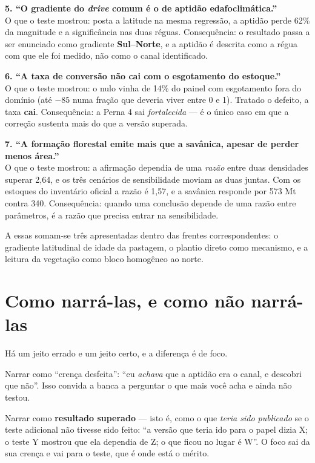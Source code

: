 \textbf{5. ``O gradiente do \emph{drive} comum é o de aptidão
edafoclimática.''}  \\
O que o teste mostrou: posta a latitude na mesma regressão, a aptidão perde 62\%
da magnitude e a significância nas duas réguas. Consequência: o resultado passa
a ser enunciado como gradiente \textbf{Sul--Norte}, e a aptidão é descrita como
a régua com que ele foi medido, não como o canal identificado.

\textbf{6. ``A taxa de conversão não cai com o esgotamento do estoque.''}
 \\
O que o teste mostrou: o nulo vinha de 14\% do painel com esgotamento fora do
domínio (até $-85$ numa fração que deveria viver entre 0 e 1). Tratado o
defeito, a taxa \textbf{cai}. Consequência: a Perna 4 sai \emph{fortalecida} ---
é o único caso em que a correção sustenta mais do que a versão superada.

\textbf{7. ``A formação florestal emite mais que a savânica, apesar de perder
menos área.''}  \\
O que o teste mostrou: a afirmação dependia de uma \emph{razão} entre duas
densidades superar 2,64, e os três cenários de sensibilidade moviam as duas
juntas. Com os estoques do inventário oficial a razão é 1,57, e a savânica
responde por 573 Mt contra 340. Consequência: quando uma conclusão depende de
uma razão entre parâmetros, é a razão que precisa entrar na sensibilidade.

\vspace{8pt}
A essas somam-se três apresentadas dentro das frentes correspondentes: o
gradiente latitudinal de idade da pastagem, o plantio direto como mecanismo, e a
leitura da vegetação como bloco homogêneo ao norte.

\section{Como narrá-las, e como não narrá-las}

Há um jeito errado e um jeito certo, e a diferença é de foco.

\begin{armadilha}
Narrar como ``crença desfeita'': ``eu \emph{achava} que a aptidão era o canal, e
descobri que não''. Isso convida a banca a perguntar o que mais você acha e
ainda não testou.
\end{armadilha}

\begin{nabanca}
Narrar como \textbf{resultado superado} --- isto é, como o que \emph{teria sido
publicado} se o teste adicional não tivesse sido feito: ``a versão que teria ido
para o papel dizia X; o teste Y mostrou que ela dependia de Z; o que ficou no
lugar é W''. O foco sai da sua crença e vai para o teste, que é onde está o
mérito.
\end{nabanca}

